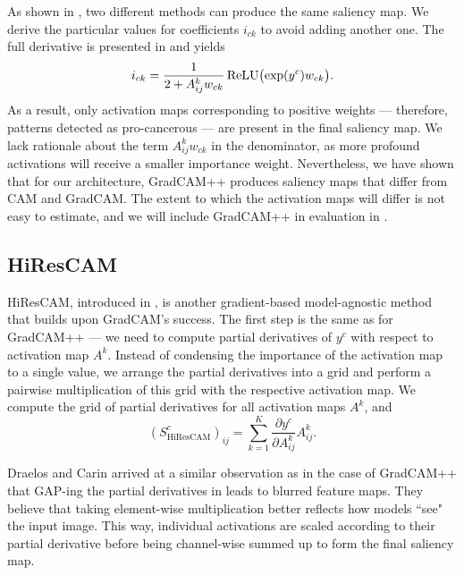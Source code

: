As shown in , two different methods can produce the same saliency map.
We derive the particular values for coefficients $i_{ck}$ to avoid adding another one. The full derivative is presented in  and yields
\begin{equation}
    i_{ck} = \frac{1}{2 + A^k_{ij}w_{ck}} \operatorname{ReLU}\bigl(\exp(y^c)w_{ck}\bigr).
\end{equation}
As a result, only activation maps corresponding to positive weights --- therefore, patterns detected as pro-cancerous --- are present in the final saliency map.
We lack rationale about the term $A^k_{ij} w_{ck}$ in the denominator, as more profound activations will receive a smaller importance weight.
Nevertheless, we have shown that for our architecture, GradCAM++ produces saliency maps that differ from CAM and GradCAM.
The extent to which the activation maps will differ is not easy to estimate, and we will include GradCAM++ in evaluation in .


\subsection{HiResCAM}

HiResCAM, introduced in \cite{hires-cam}, is another gradient-based model-agnostic method that builds upon GradCAM's success.
The first step is the same as for GradCAM++ --- we need to compute partial derivatives of $y^c$ with respect to activation map $A^k$.
Instead of condensing the importance of the activation map to a single value, we arrange the partial derivatives into a grid and perform a pairwise multiplication of this grid with the respective activation map.
We compute the grid of partial derivatives for all activation maps $A^k$, and
\begin{equation}
    (S^c_{\text{HiResCAM}})_{ij}
        = \sum_{k=1}^K \frac{\partial y^c}{\partial A^k_{ij}} A^k_{ij}.
\end{equation}

Draelos and Carin \cite{hires-cam} arrived at a similar observation as in the case of GradCAM++ that GAP-ing the partial derivatives in  leads to blurred feature maps. 
They believe that taking element-wise multiplication better reflects how models ``see" the input image.
This way, individual activations are scaled according to their partial derivative before being channel-wise summed up to form the final saliency map.


